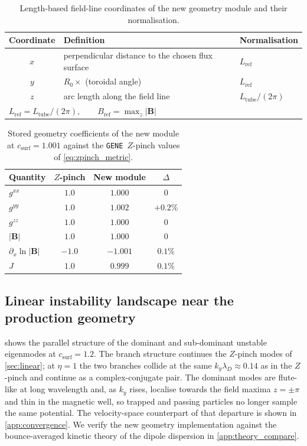 \documentclass{jpp}
\newcommand{\bB}{\mathbf{B}}
\newcommand{\lambdaD}{\lambda_D}
\newcommand{\gene}{\texttt{GENE}}
\begin{document}
\begin{table}
\centering
\begin{tabular}{cll}
\hline
Coordinate & Definition & Normalisation \\
\hline
$x$ & perpendicular distance to the chosen flux surface & $L_\mathrm{ref}$ \\
$y$ & $R_0 \times$ (toroidal angle) & $L_\mathrm{ref}$ \\
$z$ & arc length along the field line & $L_\mathrm{tube}/(2\pi)$ \\
\hline
\multicolumn{3}{l}{$L_\mathrm{ref} = L_\mathrm{tube}/(2\pi), \qquad B_\mathrm{ref} = \max_z |\bB|$} \\
\hline
\end{tabular}
\caption{Length-based field-line coordinates of the new geometry module and their normalisation.}
\label{tab:fix_coords}
\end{table}

\begin{table}
\centering
\begin{tabular}{lccc}
\hline
Quantity & $Z$-pinch & New module & $\Delta$ \\
\hline
$g^{xx}$    & $1.0$  & $1.000$  & $0$    \\
$g^{yy}$    & $1.0$  & $1.002$  & $+0.2\%$ \\
$g^{zz}$    & $1.0$  & $1.000$  & $0$    \\
$|\bB|$       & $1.0$  & $1.000$  & $0$    \\
$\partial_x \ln |\bB|$  & $-1.0$ & $-1.001$ & $0.1\%$ \\
$J$         & $1.0$  & $0.999$  & $0.1\%$ \\
\hline
\end{tabular}
\caption{Stored geometry coefficients of the new module at $c_\mathrm{surf} = 1.001$ against the \gene\ $Z$-pinch values of \cref{eq:zpinch_metric}.}
\label{tab:metric_match}
\end{table}

\subsection{Linear instability landscape near the production geometry}\label{app:dipole_lin_landscape}

 shows the parallel structure of the dominant and sub-dominant unstable eigenmodes at $c_\mathrm{surf} = 1.2$. The branch structure continues the $Z$-pinch modes of \cref{sec:linear}; at $\eta = 1$ the two branches collide at the same $k_y\lambdaD \approx 0.14$ as in the $Z$-pinch and continue as a complex-conjugate pair. The dominant modes are flute-like at long wavelength and, as $k_y$ rises, localise towards the field maxima $z = \pm\pi$ and thin in the magnetic well, so trapped and passing particles no longer sample the same potential. The velocity-space counterpart of that departure is shown in \cref{app:convergence}. We verify the new geometry implementation against the bounce-averaged kinetic theory of the dipole dispersion in \cref{app:theory_compare}.
\end{document}
